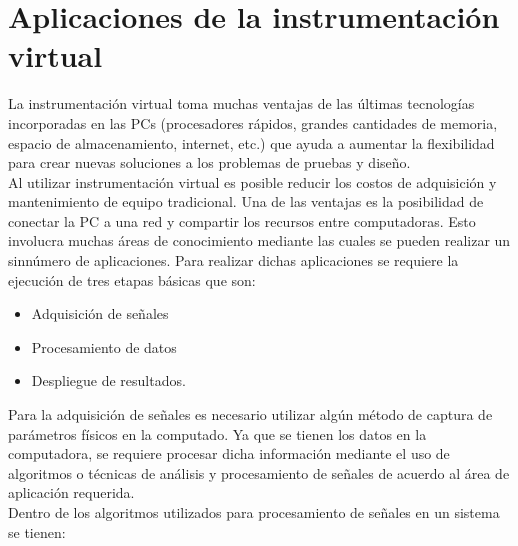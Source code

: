 \documentclass[12pt,letterpaper, onecolumn, titlepage, oneside]{book}
\begin{document}
\section{Aplicaciones de la instrumentación virtual}
La instrumentación virtual toma muchas ventajas de las últimas tecnologías incorporadas en las PCs (procesadores rápidos, grandes cantidades de memoria, espacio de almacenamiento, internet, etc.) que ayuda a aumentar la flexibilidad para crear nuevas soluciones a los problemas de pruebas y diseño.\\
Al utilizar instrumentación virtual es posible reducir los costos de adquisición y mantenimiento de equipo tradicional. Una de las ventajas es la posibilidad de conectar la PC a una red y compartir los recursos entre computadoras. Esto involucra muchas áreas de conocimiento mediante las cuales se pueden realizar un sinnúmero de aplicaciones. Para realizar dichas aplicaciones se requiere la ejecución de tres etapas básicas que son:\\
\begin{itemize}
    \item Adquisición de señales
    \item Procesamiento de datos
    \item Despliegue de resultados.
\end{itemize}
Para la adquisición de señales es necesario utilizar algún método de captura de parámetros físicos en la computado. Ya que se tienen los datos en la computadora, se requiere procesar dicha información mediante el uso de algoritmos o técnicas de análisis y procesamiento de señales de acuerdo al área de aplicación requerida.\\
Dentro de los algoritmos utilizados para procesamiento de señales en un sistema se tienen:
\end{document}
